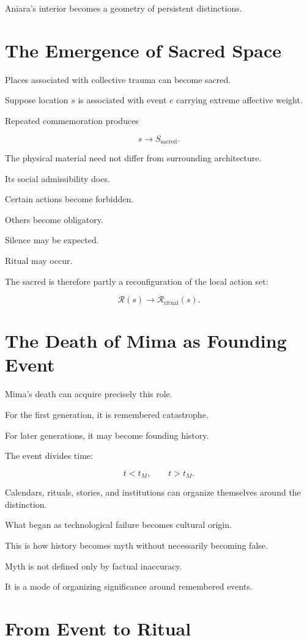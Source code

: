\documentclass[11pt,oneside]{book}
\theoremstyle{definition}
\theoremstyle{remark}
\newcommand{\R}{\mathcal{R}}
\begin{document}
Aniara's interior becomes a geometry of persistent distinctions.

\section{The Emergence of Sacred Space}

Places associated with collective trauma can become sacred.

Suppose location \(s\) is associated with event \(e\) carrying extreme affective weight.

Repeated commemoration produces

\[
s
\rightarrow
S_{\mathrm{sacred}}.
\]

The physical material need not differ from surrounding architecture.

Its social admissibility does.

Certain actions become forbidden.

Others become obligatory.

Silence may be expected.

Ritual may occur.

The sacred is therefore partly a reconfiguration of the local action set:

\[
\R(s)
\rightarrow
\R_{\mathrm{ritual}}(s).
\]

\section{The Death of Mima as Founding Event}

Mima's death can acquire precisely this role.

For the first generation, it is remembered catastrophe.

For later generations, it may become founding history.

The event divides time:

\[
t<t_M,
\qquad
t>t_M.
\]

Calendars, rituals, stories, and institutions can organize themselves around the distinction.

What began as technological failure becomes cultural origin.

This is how history becomes myth without necessarily becoming false.

Myth is not defined only by factual inaccuracy.

It is a mode of organizing significance around remembered events.

\section{From Event to Ritual}
\end{document}
